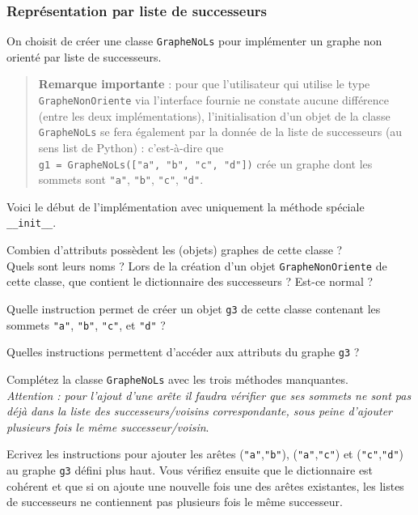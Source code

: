 \documentclass[12pt]{book}
\begin{document}
\subsubsection{Représentation par liste de successeurs}\label{repruxe9sentation-par-liste-de-successeurs}

On choisit de créer une classe \texttt{GrapheNoLs} pour implémenter un
graphe non orienté par liste de successeurs.

\begin{quote}
\textbf{Remarque importante} : pour que l'utilisateur qui utilise le
type \texttt{GrapheNonOriente} via l'interface fournie ne constate
aucune différence (entre les deux implémentations), l'initialisation
d'un objet de la classe \texttt{GrapheNoLs} se fera également par la
donnée de la liste de successeurs (au sens list de Python) :
c'est-à-dire que \texttt{g1\ =\ GrapheNoLs({[}"a",\ "b",\ "c",\ "d"{]})}
crée un graphe dont les sommets sont \texttt{"a"}, \texttt{"b"},
\texttt{"c"}, \texttt{"d"}.
\end{quote}

Voici le début de l'implémentation avec uniquement la méthode spéciale
\texttt{\_\_init\_\_}.


\Quest[1] Combien d'attributs possèdent les (objets) graphes de cette classe ?\\  Quels sont leurs noms ? Lors de la création d'un objet \texttt{GrapheNonOriente} de cette classe, que contient le dictionnaire des successeurs ? Est-ce normal ?

\Quest Quelle instruction permet de créer un objet \texttt{g3} de cette classe contenant les sommets \texttt{"a"}, \texttt{"b"}, \texttt{"c"}, et \texttt{"d"} ?


\Quest Quelles instructions permettent d'accéder aux attributs du graphe \texttt{g3} ?


\Quest Complétez la classe \texttt{GrapheNoLs} avec les trois méthodes manquantes. \\
\emph{Attention : pour l'ajout d'une arête il faudra vérifier que ses sommets ne sont pas déjà dans la liste des successeurs/voisins correspondante, sous peine d'ajouter plusieurs fois le même successeur/voisin}.

\Quest Ecrivez les instructions pour ajouter les arêtes (\texttt{"a"},\texttt{"b"}), (\texttt{"a"},\texttt{"c"}) et (\texttt{"c"},\texttt{"d"}) au graphe \texttt{g3} défini plus haut. Vous vérifiez ensuite que le dictionnaire est cohérent et que si on ajoute une nouvelle fois une des arêtes existantes, les listes de successeurs ne contiennent pas plusieurs fois le même successeur.
\end{document}
